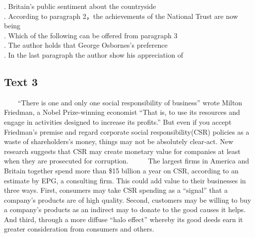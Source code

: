 \begin{questions} . Britain’s public sentiment about the countryside
　　\\ . According to paragraph 2，the achievements of the National Trust are now being
　　\\ . Which of the following can be offered from paragraph 3
　　\\ . The author holds that George Osbornes’s preference
　　\\ . In the last paragraph the author show his appreciation of
　　\\ \end{questions}      \subsection{Text 3}
　　“There is one and only one social responsibility of business” wrote Milton Friedman, a Nobel Prize-winning economist “That is, to use its resources and engage in activities designed to increase its profits.” But even if you accept Friedman’s premise and regard corporate social responsibility(CSR) policies as a waste of shareholders’s money, things may not be absolutely clear-act. New research suggests that CSR may create monetary value for companies at least when they are prosecuted for corruption. 
　　The largest firms in America and Britain together spend more than \$15 billion a year on CSR, according to an estimate by EPG, a consulting firm. This could add value to their businesses in three ways. First, consumers may take CSR spending as a “signal” that a company’s products are of high quality. Second, customers may be willing to buy a company’s products as an indirect may to donate to the good causes it helps. And third, through a more diffuse “halo effect” whereby its good deeds earn it greater consideration from consumers and others. 
